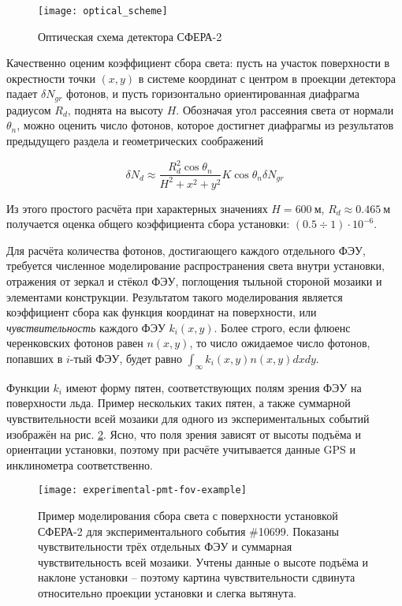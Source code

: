 \begin{figure}
	\centering
	\texttt{[image: optical\_scheme]}
	\caption{Оптическая схема детектора СФЕРА-2}
	\label{pic:sphere-detector-optical-scheme}
\end{figure}

Качественно оценим коэффициент сбора света: пусть на участок поверхности в окрестности точки $(x, y)$ в системе координат с центром в проекции детектора падает $\delta N_{gr}$ фотонов, и пусть горизонтально ориентированная диафрагма радиусом $R_{d}$, поднята на высоту $H$. Обозначая угол рассеяния света от нормали $\theta_n$, можно оценить число фотонов, которое достигнет диафрагмы из результатов предыдущего раздела и геометрических соображений

\begin{equation}
	\delta N_{d} \approx \frac{R_d^2 \cos \theta_n}{H^2 + x^2 + y^2} K \cos \theta_n \delta N_{gr}
\end{equation}

Из этого простого расчёта при характерных значениях $H = 600~\text{м}$, $R_d \approx 0.465~\text{м}$ получается оценка общего коэффициента сбора установки: $(0.5 \div 1) \cdot 10^{-6}$.

Для расчёта количества фотонов, достигающего каждого отдельного ФЭУ, требуется численное моделирование распространения света внутри установки, отражения от зеркал и стёкол ФЭУ, поглощения тыльной стороной мозаики и элементами конструкции. Результатом такого моделирования является коэффициент сбора как функция координат на поверхности, или \textit{чувствительность} каждого ФЭУ $k_i(x, y)$. Более строго, если флюенс черенковских фотонов равен $n(x, y)$, то число ожидаемое число фотонов, попавших в $i$-тый ФЭУ, будет равно $\int_{\infty} k_i(x, y) n(x, y) dx dy$.

Функции $k_i$ имеют форму пятен, соответствующих полям зрения ФЭУ на поверхности льда. Пример нескольких таких пятен, а также суммарной чувствительности всей мозаики для одного из экспериментальных событий изображён на рис. \ref{pic:experimental-pmt-fov-example}. Ясно, что поля зрения зависят от высоты подъёма и ориентации установки, поэтому при расчёте учитывается данные GPS и инклинометра соответственно.

\begin{figure}
	\centering
	\texttt{[image: experimental-pmt-fov-example]}
	\caption{Пример моделирования сбора света с поверхности установкой СФЕРА-2 для экспериментального события \#10699. Показаны чувствительности трёх отдельных ФЭУ и суммарная чувствительность всей мозаики. Учтены данные о высоте подъёма и наклоне установки -- поэтому картина чувствительности сдвинута относительно проекции установки и слегка вытянута.}
	\label{pic:experimental-pmt-fov-example}
\end{figure}

